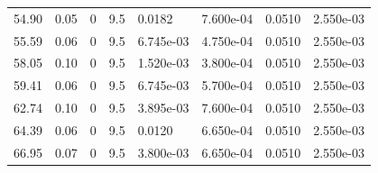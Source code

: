 \documentclass[preview]{standalone}
\begin{document}
{{\begin{tabular}{L{1.2cm}C{1.2cm} C{0.3cm}C{0.5cm} C{1.4cm}C{1.4cm} C{1.4cm}C{1.4cm}}
  54.90  &  0.05  & 0     & 9.5 &  0.0182  & 7.600e-04  & 0.0510 &  2.550e-03   \\ 
  55.59  &  0.06  & 0     & 9.5 &  6.745e-03  & 4.750e-04  & 0.0510 &  2.550e-03   \\ 
  58.05  &  0.10  & 0     & 9.5 &  1.520e-03  & 3.800e-04  & 0.0510 &  2.550e-03   \\ 
  59.41  &  0.06  & 0     & 9.5 &  6.745e-03  & 5.700e-04  & 0.0510 &  2.550e-03   \\ 
  62.74  &  0.10  & 0     & 9.5 &  3.895e-03  & 7.600e-04  & 0.0510 &  2.550e-03   \\ 
  64.39  &  0.06  & 0     & 9.5 &  0.0120  & 6.650e-04  & 0.0510 &  2.550e-03   \\ 
  66.95  &  0.07  & 0     & 9.5 &  3.800e-03  & 6.650e-04  & 0.0510 &  2.550e-03   \\ 
\hline 
\end{tabular} 

}}
\end{document}
